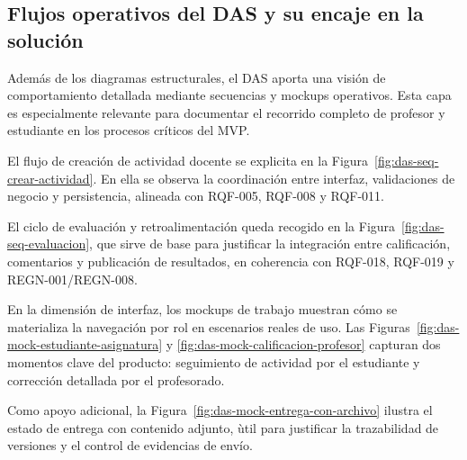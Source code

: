 \subsection{Flujos operativos del DAS y su encaje en la soluci\'on}

Adem\'as de los diagramas estructurales, el DAS aporta una visi\'on de
comportamiento detallada mediante secuencias y mockups operativos. Esta capa
es especialmente relevante para documentar el recorrido completo de profesor y
estudiante en los procesos cr\'iticos del MVP.

El flujo de creaci\'on de actividad docente se explicita en la
Figura~\ref{fig:das-seq-crear-actividad}. En ella se observa la
coordinaci\'on entre interfaz, validaciones de negocio y persistencia,
alineada con RQF-005, RQF-008 y RQF-011.


El ciclo de evaluaci\'on y retroalimentaci\'on queda recogido en la
Figura~\ref{fig:das-seq-evaluacion}, que sirve de base para justificar la
integraci\'on entre calificaci\'on, comentarios y publicaci\'on de resultados,
en coherencia con RQF-018, RQF-019 y REGN-001/REGN-008.


En la dimensi\'on de interfaz, los mockups de trabajo muestran c\'omo se
materializa la navegaci\'on por rol en escenarios reales de uso. Las
Figuras~\ref{fig:das-mock-estudiante-asignatura} y
\ref{fig:das-mock-calificacion-profesor} capturan dos momentos clave del
producto: seguimiento de actividad por el estudiante y correcci\'on detallada
por el profesorado.



Como apoyo adicional, la Figura~\ref{fig:das-mock-entrega-con-archivo}
ilustra el estado de entrega con contenido adjunto, \`util para justificar
la trazabilidad de versiones y el control de evidencias de env\'io.

